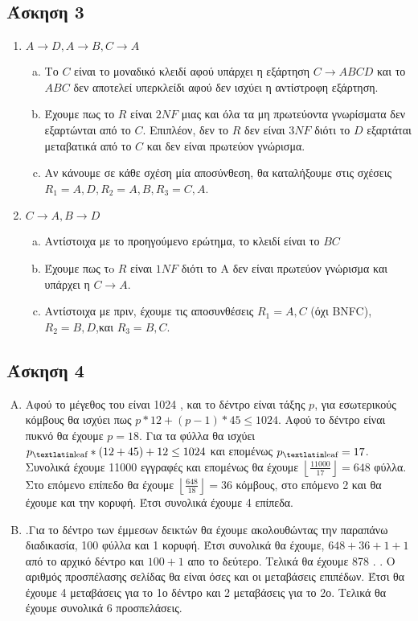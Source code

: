 \documentclass{assignment}
\begin{document}
\subsection*{Άσκηση 3}
\begin{enumerate}[(1)]
\item $A\rightarrow D,A \rightarrow B ,C\rightarrow A$ 
\begin{enumerate}[(a)]
\item Το $C$ είναι το μοναδικό κλειδί αφού υπάρχει η εξάρτηση $C \rightarrow ABCD$ και το $ABC$ δεν αποτελεί υπερκλείδι αφού δεν ισχύει η αντίστροφη εξάρτηση.
\item Έχουμε πως το $R$ είναι $2NF$ μιας και όλα τα μη πρωτεύοντα γνωρίσματα δεν εξαρτώνται από το $C$. Επιπλέον, δεν το $R$ δεν είναι $3NF$ διότι το $D$ εξαρτάται μεταβατικά από το $C$ και δεν είναι πρωτεύον γνώρισμα.
\item Αν κάνουμε σε κάθε σχέση μία αποσύνθεση, θα καταλήξουμε στις σχέσεις $R_1 = {A,D}, R_2 = {A, B}, R_3 = {C,A}$. 
\end{enumerate}
\item $C\rightarrow A, B\rightarrow D$
\begin{enumerate}[(a)]
\item Αντίστοιχα με το προηγούμενο ερώτημα, το κλειδί είναι το $BC$
\item Έχουμε πως τo $R$ είναι $1NF$ διότι το Α δεν είναι πρωτεύον γνώρισμα και υπάρχει η $C\rightarrow A $.
\item Αντίστοιχα με πριν, έχουμε τις αποσυνθέσεις $R_1 ={A,C}$ (όχι BNFC),$R_2 ={B,D}$,και $R_3 ={B,C}$.
\end{enumerate}

\end{enumerate}
\subsection*{Άσκηση 4}

\begin{enumerate}[(A)]
\item Αφού το μέγεθος του  είναι 1024 , και το δέντρο είναι τάξης $p$, για εσωτερικούς κόμβους θα ισχύει πως $p*12 + (p-1)*45 \le 1024$. Αφού το δέντρο είναι πυκνό θα
    έχουμε $p=18$. Για τα φύλλα θα ισχύει $p_\text{\en{leaf}} * (12 + 45) + 12 \le 1024$ και επομένως $p_\text{\en{leaf}} = 17$. 
Συνολικά έχουμε 11000 εγγραφές και επομένως θα έχουμε $\left\lfloor\frac{11000}{17}\right\rfloor = 648$ φύλλα.
Στο επόμενο επίπεδο θα έχουμε $\left \lfloor\frac{648}{18}\right\rfloor = 36$ κόμβους, στο επόμενο 2 και θα έχουμε και την κορυφή. Έτσι συνολικά έχουμε 4 επίπεδα.

\item {}.Για το δέντρο των έμμεσων δεικτών θα έχουμε ακολουθώντας την παραπάνω διαδικασία, 100 φύλλα και 1 κορυφή. Έτσι συνολικά θα έχουμε, $648+36+1+1$  από το αρχικό δέντρο και $100+1$ απο το δεύτερο. Τελικά θα έχουμε 878 .  
. Ο αριθμός προσπέλασης σελίδας θα είναι όσες και οι μεταβάσεις επιπέδων. Έτσι θα έχουμε 4 μεταβάσεις για το 1ο δέντρο και 2 μεταβάσεις για το 2ο. Τελικά θα έχουμε συνολικά 6 προσπελάσεις.




\end{enumerate} 
\end{document}
